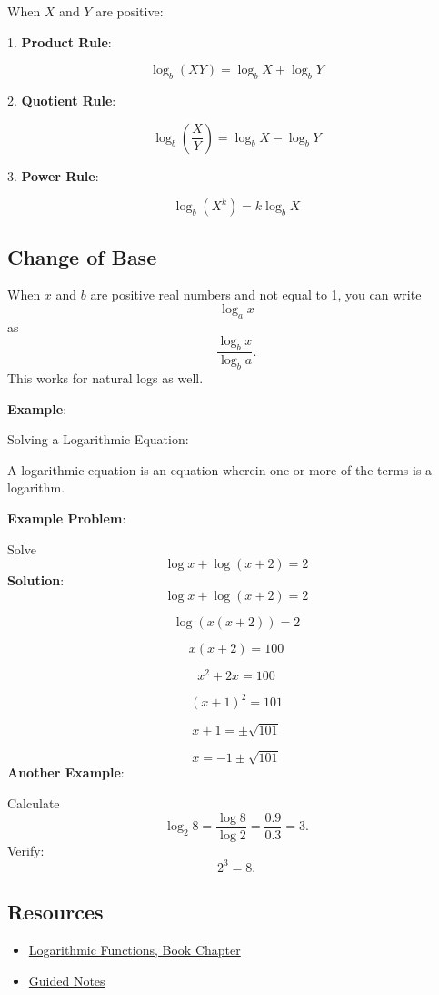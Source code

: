 When $X$ and $Y$ are positive:

1. \textbf{Product Rule}:

   \[
\log_b (XY) = \log_b X + \log_b Y
\]

2. \textbf{Quotient Rule}:

   \[
\log_b \left(\frac{X}{Y}\right) = \log_b X - \log_b Y
\]

3. \textbf{Power Rule}:

   \[
\log_b (X^k) = k \log_b X
\]

\subsection{Change of Base}
\label{sss:chan-d752}

When $x$ and $b$ are positive real numbers and not equal to 1, you can write 
\[
\log_a x
\]
as
\[
\frac{\log_b x}{\log_b a}.
\]
This works for natural logs as well.

\textbf{Example}:

Solving a Logarithmic Equation:

A logarithmic equation is an equation wherein one or more of the terms is a logarithm.

\textbf{Example Problem}:

Solve
\[
\log x + \log(x+2) = 2
\]
\textbf{Solution}:
\[
\log x + \log(x+2) = 2
\]

\[
\log (x(x+2)) = 2
\]

\[
x(x+2) = 100
\]

\[
x^2 + 2x = 100
\]

\[
(x+1)^2 = 101
\]

\[
x+1 = \pm \sqrt{101}
\]

\[
x = -1 \pm \sqrt{101}
\]
\textbf{Another Example}:

Calculate
\[
\log_2 8 = \frac{\log 8}{\log 2} = \frac{0.9}{0.3} = 3.
\]
Verify:
\[
2^3 = 8.
\]

\subsection{Resources}
\label{sss:reso-55b5}

\begin{itemize}
    \item \href{https://mathresearch.utsa.edu/wikiFiles/MAT1053/Logarithmic_Functions/MAT1053_M5.2Logarithmic_Functions.pdf}{Logarithmic Functions, Book Chapter}
    \item \href{https://mathresearch.utsa.edu/wikiFiles/MAT1053/Logarithmic_Functions/MAT1053_M5.2Logarithmic_FunctionsGN.pdf}{Guided Notes}
\end{itemize}

